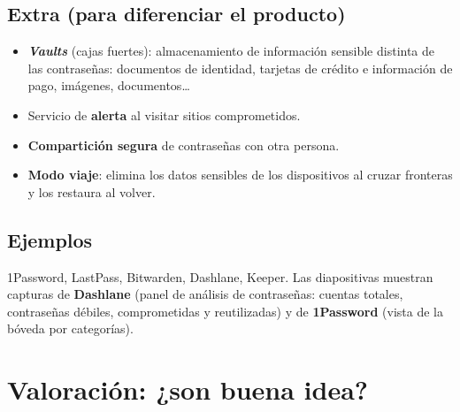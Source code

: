 \documentclass[11pt,a4paper]{report}
\begin{document}
\subsection{Extra (para diferenciar el producto)}
\begin{itemize}
  \item \textbf{\emph{Vaults}} (cajas fuertes): almacenamiento de información sensible distinta de las contraseñas: documentos de identidad, tarjetas de crédito e información de pago, imágenes, documentos\ldots
  \item Servicio de \textbf{alerta} al visitar sitios comprometidos.
  \item \textbf{Compartición segura} de contraseñas con otra persona.
  \item \textbf{Modo viaje}: elimina los datos sensibles de los dispositivos al cruzar fronteras y los restaura al volver.
\end{itemize}
 
\subsection{Ejemplos}
1Password, LastPass, Bitwarden, Dashlane, Keeper. Las diapositivas muestran capturas de \textbf{Dashlane} (panel de análisis de contraseñas: cuentas totales, contraseñas débiles, comprometidas y reutilizadas) y de \textbf{1Password} (vista de la bóveda por categorías).
 
\section{Valoración: ¿son buena idea?}
 
\end{document}
